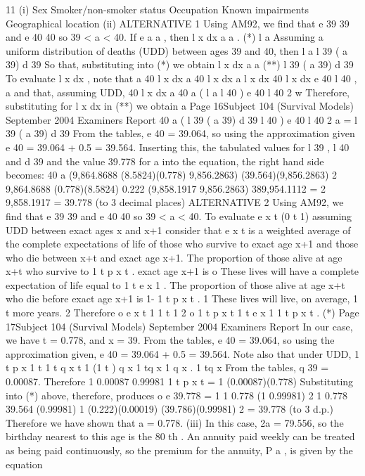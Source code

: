 \documentclass[a4paper,12pt]{article}
\begin{document}
11
(i) Sex
Smoker/non-smoker status
Occupation
Known impairments
Geographical location
(ii) ALTERNATIVE 1
Using AM92, we find that e 39
39 and e 40
40
so 39 < a < 40.
If
e a
a , then
l x dx
a
a
. (*)
l a
Assuming a uniform distribution of deaths (UDD) between ages 39 and 40,
then
l a l 39 ( a 39) d 39
So that, substituting into (*) we obtain
l x dx
a
a
(**)
l 39 ( a 39) d 39
To evaluate l x dx , note that
a
40
l x dx
a
40
l x dx
a
l x dx
40
l x dx e 40 l 40 ,
a
and that, assuming UDD,
40
l x dx
a
40 a
( l a l 40 ) e 40 l 40
2
w
Therefore, substituting for
l x dx in (**) we obtain
a
Page 16Subject 104 (Survival Models)
September 2004
Examiners Report
40 a
( l 39 ( a 39) d 39 l 40 ) e 40 l 40
2
a =
l 39 ( a 39) d 39
From the tables, e 40 = 39.064, so using the approximation given e 40 = 39.064
+ 0.5 = 39.564. Inserting this, the tabulated values for l 39 , l 40 and d 39 and the
value 39.778 for a into the equation, the right hand side becomes:
40 a
(9,864.8688 (8.5824)(0.778) 9,856.2863) (39.564)(9,856.2863)
2
9,864.8688 (0.778)(8.5824)
0.222
(9,858.1917 9,856.2863) 389,954.1112
= 2
9,858.1917
= 39.778 (to 3 decimal places)
ALTERNATIVE 2
Using AM92, we find that e 39
39 and e 40
40
so 39 < a < 40.
To evaluate e x t (0
t
1) assuming UDD between exact ages
x and x+1
consider that e x t is a weighted average of the complete expectations of life of
those who survive to exact age x+1 and those who die between x+t and exact
age x+1.
The proportion of those alive at age x+t who survive to
1 t p x t .
exact age x+1 is
o
These lives will have a complete expectation of life equal to 1 t e x 1 .
The proportion of those alive at age x+t who die before exact age x+1 is
1- 1 t p x t .
1
These lives will live, on average, 1 t more years.
2
Therefore
o
e x
t
1
1 t 1
2
o
1 t
p x
t
1 t e x
1 1 t
p x t . (*)
Page 17Subject 104 (Survival Models)
September 2004
Examiners Report
In our case, we have t = 0.778, and x = 39. From the tables, e 40 = 39.064,
so using the approximation given, e 40 = 39.064 + 0.5 = 39.564.
Note also that under UDD,
1 t
p x
1
t
1 t
q x
t
1
(1 t ) q x
1 tq x
1 q x
.
1 tq x
From the tables, q 39 = 0.00087. Therefore
1 0.00087
0.99981
1 t p x t =
1 (0.00087)(0.778)
Substituting into (*) above, therefore, produces
o
e 39.778
=
1
1 0.778 (1 0.99981)
2
1 0.778 39.564 (0.99981)
1
(0.222)(0.00019) (39.786)(0.99981)
2
= 39.778 (to 3 d.p.)
Therefore we have shown that a = 0.778.
(iii)
In this case, 2a = 79.556, so the birthday nearest to this age is the 80 th .
An annuity paid weekly can be treated as being paid continuously, so the
premium for the annuity, P a , is given by the equation
\end{document}
